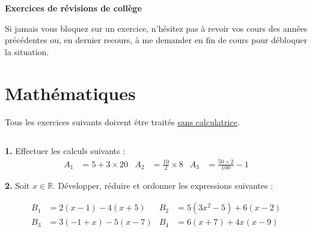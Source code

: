 \newpage

\sndEnTeteRevision

\begin{center}
\begin{mdframed}[style=titr, leftmargin=60pt, rightmargin=60pt, innertopmargin=7pt, innerbottommargin=7pt, innerrightmargin=8pt, innerleftmargin=8pt]

\begin{center}
\large{\textbf{Exercices de révisions de collège}}
\end{center}

\end{mdframed}


\end{center}
Si jamais vous bloquez sur un exercice, n'hésitez pas à revoir vos cours des années précédentes ou, en dernier recours, à me demander en fin de cours pour débloquer la situation.

\renewcommand{\thesubsection}{\textcolor{red}{\textbf{Exercice \arabic{subsection} }}}

\section{Mathématiques}
Tous les exercices suivants doivent être traités \underline{sans calculatrice}.
\subsection{}
\textbf{1.} Effectuer les calculs suivants :
\begin{align*}
    A_1 &= 5 + 3\times20 & A_2 &= \frac{10}{2}\times 8 & A_3 &= \frac{50\times2}{100}-1
\end{align*}
 
 \textbf{2.} Soit $x\in\mathbb{R}$. Développer, réduire et ordonner les expressions suivantes :

 \begin{align*}
B_1 & = 2(x-1)-4(x+5) & B_2 & = 5(3x^2-5)+6(x-2) \\
B_3 & = 3(-1+x)-5(x-7) & B_4 & = 6(x+7)+4x(x-9)  \\
\end{align*}

